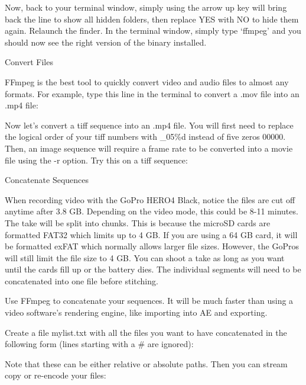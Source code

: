 \begin{fullwidth}
Now, back to your terminal window, simply using the arrow up key will bring back the line to show all hidden folders, then replace YES with NO to hide them again. Relaunch the finder. In the terminal window, simply type ‘ffmpeg’ and you should now see the right version of the binary installed.

{\large Convert Files \par}

FFmpeg is the best tool to quickly convert video and audio files to almost any formats. For example, type this line in the terminal to convert a .mov file into an .mp4 file:


Now let’s convert a tiff sequence into an .mp4 file. You will first need to replace the logical order of your tiff numbers with \_05\%d instead of five zeros 00000. Then, an image sequence will require a frame rate to be converted into a movie file using the -r option. Try this on a tiff sequence:


{\large Concatenate Sequences \par}

When recording video with the GoPro HERO4 Black, notice the files are cut off anytime after 3.8 GB. Depending on the video mode, this could be 8-11 minutes. The take will be split into chunks. This is because the microSD cards are formatted FAT32 which limits up to 4 GB. If you are using a 64 GB card, it will be formatted exFAT which normally allows larger file sizes. However, the GoPros will still limit the file size to 4 GB. You can shoot a take as long as you want until the cards fill up or the battery dies. The individual segments will need to be concatenated into one file before stitching.

Use FFmpeg to concatenate your sequences. It will be much faster than using a video software’s rendering engine, like importing into AE and exporting.

Create a file mylist.txt with all the files you want to have concatenated in the following form (lines starting with a # are ignored):


Note that these can be either relative or absolute paths. Then you can stream copy or re-encode your files:



\end{fullwidth}
